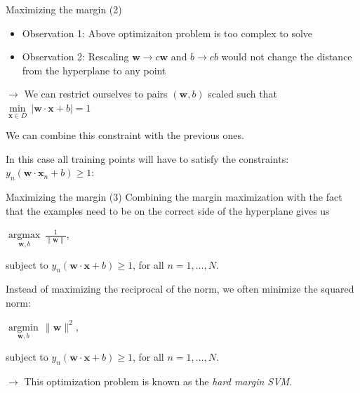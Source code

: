 \documentclass[dvipsnames]{beamer}
\DeclareMathOperator*{\argmax}{argmax}
\DeclareMathOperator*{\argmin}{argmin}
\begin{document}
    \begin{frame}{Maximizing the margin (2)}
			\begin{itemize}
				\item Observation 1: Above optimizaiton problem is too complex to solve \pause
				\item Observation 2: Rescaling $\mathbf{w} \rightarrow c\mathbf{w}$ and $b\rightarrow cb$ would not change the distance from the hyperplane to any point \pause
			\end{itemize}
			$\rightarrow$ We can restrict ourselves to pairs $(\mathbf{w},b)$ scaled such that $\underset{\mathbf{x}\in D}{\min}\, |\mathbf{w} \cdot \mathbf{x} + b| = 1$ \pause
			
			We can combine this constraint with the previous ones. \pause
			
			In this case all training points will have to satisfy the constraints: $y_{n}(\mathbf{w} \cdot \mathbf{x}_n + b) \geq 1$:
    \end{frame}
		
		\begin{frame}{Maximizing the margin (3)}
			Combining the margin maximization with the fact that the examples need to be on the correct side of the hyperplane gives us
			
			$\underset{\mathbf{w},b}{\argmax}\, \frac{1}{\|\mathbf{w}\|}$,
			
			subject to $y_{n}(\mathbf{w} \cdot \mathbf{x} + b)\geq 1$, for all $n = 1, \dots,N$. \pause
			
			Instead of maximizing the reciprocal of the norm, we often minimize the squared norm:
			
			$\underset{\mathbf{w},b}{\argmin}\,\|\mathbf{w}\|^2$,
			
			subject to $y_{n}(\mathbf{w} \cdot \mathbf{x} + b)\geq 1$, for all $n = 1, \dots,N$. \pause
			
			$\rightarrow$ This optimization problem is known as the \emph{hard margin SVM}.
    \end{frame}
		
\end{document}
